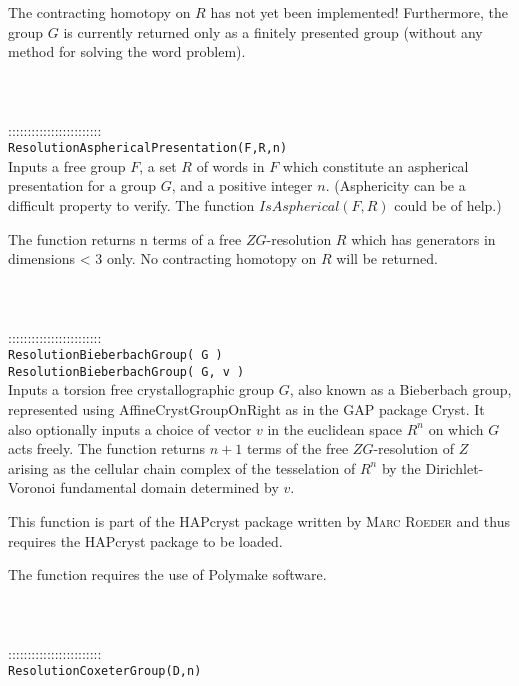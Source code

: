 \documentclass[a4paper,11pt]{report}
\begin{document}
{ The contracting homotopy on $R$ has not yet been implemented! Furthermore, the group $G$ is currently returned only as a finitely presented group (without any method
for solving the word problem). \\
 \\
 \\
 \\
 ::::::::::::::::::::::::\\
 \texttt{ResolutionAsphericalPresentation(F,R,n)}\\
 

 Inputs a free group $F$, a set $R$ of words in $F$ which constitute an aspherical presentation for a group $G$, and a positive integer $n$. (Asphericity can be a difficult property to verify. The function $IsAspherical(F,R)$ could be of help.)

 The function returns n terms of a free $ZG$-resolution $R$ which has generators in dimensions {\textless} 3 only. No contracting homotopy
on $R$ will be returned. \\
 \\
 \\
 \\
 ::::::::::::::::::::::::\\
 \texttt{ResolutionBieberbachGroup( G ) }\\
 \texttt{ResolutionBieberbachGroup( G, v ) }\\
 

 Inputs a torsion free crystallographic group $G$, also known as a Bieberbach group, represented using AffineCrystGroupOnRight
as in the GAP package Cryst. It also optionally inputs a choice of vector $v$ in the euclidean space $R^n$ on which $G$ acts freely. The function returns $n+1$ terms of the free $ZG$-resolution of $Z$ arising as the cellular chain complex of the tesselation of $R^n$ by the Dirichlet-Voronoi fundamental domain determined by $v$. 

 This function is part of the HAPcryst package written by \textsc{Marc Roeder} and thus requires the HAPcryst package to be loaded. 

 The function requires the use of Polymake software. \\
 \\
 \\
 \\
 ::::::::::::::::::::::::\\
 \texttt{ResolutionCoxeterGroup(D,n)}\\
 

}
\end{document}
